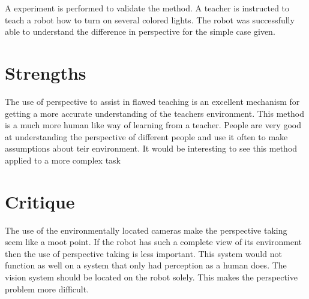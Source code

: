 \documentclass{article}
\begin{document}
A experiment is performed to validate the method. A teacher is instructed to teach a robot how to turn on several colored lights. The robot was successfully able to understand the difference in perspective for the simple case given.
\section*{Strengths}
The use of perspective to assist in flawed teaching is an excellent mechanism for getting a more accurate understanding of the teachers environment. This method is a much more human like way of learning from a teacher. People are very good at understanding the perspective of different people and use it often to make assumptions about teir environment. It would be interesting to see this method applied to a more complex task
\section*{Critique}
The use of the environmentally located cameras make the perspective taking seem like a moot point. If the robot has such a complete view of its environment then the use of perspective taking is less important. This system would not function as well on a system that only had perception as a human does. The vision system should be located on the robot solely.  This makes the perspective problem more difficult.
\cite{chernova2010confidence}
\end{document}
